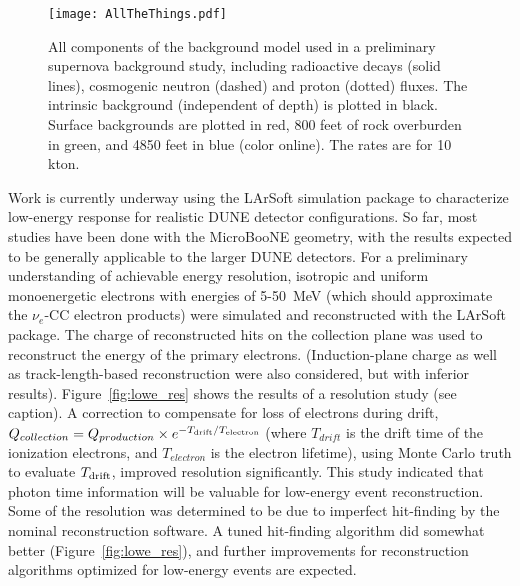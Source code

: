 \begin{figure}[htbp]
\begin{center}
\texttt{[image: AllTheThings.pdf]}
\caption{
All components of the background model used in a preliminary supernova background study, including radioactive decays (solid lines), cosmogenic neutron (dashed) and proton (dotted) fluxes.  The intrinsic background (independent of depth) is plotted in black.  Surface backgrounds are plotted in red, 800 feet of rock overburden in green, and 4850 feet in blue (color online). The rates are for 10 kton. } 
\label{fig:vicbg}
\end{center}
\end{figure}



Work is currently underway using the LArSoft simulation package
to characterize low-energy
response for realistic DUNE detector configurations.
So far,
most studies have been done with the MicroBooNE geometry, with the
results expected to be %
generally applicable to the larger DUNE detectors.  For a preliminary
understanding of achievable energy resolution, isotropic and uniform
monoenergetic electrons with energies of 5-50~MeV (which should
approximate the $\nu_e$-CC electron products) were simulated and
reconstructed with the LArSoft
package. 
The charge of reconstructed hits on the collection plane was used to
reconstruct the energy of the primary electrons. (Induction-plane charge
as well as track-length-based reconstruction were also considered, but
with inferior results). Figure~\ref{fig:lowe_res} shows the results of a resolution study (see caption).
A correction to compensate for loss of electrons during drift,
$Q_{collection}=Q_{production}\times e^{-T_{\rm drift} / T_{\rm
    electron}}$ (where $T_{drift}$ is the drift time of the ionization
electrons, and $T_{electron}$ is the electron lifetime), using Monte
Carlo truth to evaluate $T_{\rm drift}$, improved resolution
significantly.  This study indicated that photon time information will
be valuable for low-energy event reconstruction.  Some of the
resolution was determined to be due to imperfect hit-finding by the
nominal reconstruction software.  A tuned hit-finding algorithm did
somewhat better (Figure~\ref{fig:lowe_res}), and further
improvements for reconstruction algorithms optimized for low-energy
events are expected.
%
